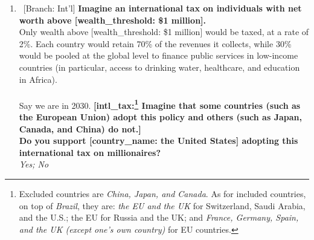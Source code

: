 \begin{enumerate}[resume]
\item ~[Branch: Int'l] \label{q:intl_tax_support} \textbf{Imagine an international tax on individuals with net worth above [wealth\_threshold: \$1 million].~}\\Only wealth above [wealth\_threshold: \$1 million] would be taxed, at a rate of 2\%. Each country would retain 70\% of the revenues it collects, while 30\% would be pooled at the global level to finance public services in low-income countries (in particular, access to drinking water, healthcare, and education in Africa). \\\\Say we are in 2030.\textbf{ [intl\_tax:\footnote{Excluded countries are \textit{China, Japan, and Canada}. As for included countries, on top of \textit{Brazil}, they are: \textit{the EU and the UK} for Switzerland, Saudi Arabia, and the U.S.; the EU\textit{} for Russia and the UK; and \textit{France, Germany, Spain, and the UK (except one's own country)} for EU countries.} Imagine that some countries  (such as the European Union) adopt this policy and others (such as Japan, Canada, and China) do not.]\\Do you support [country\_name: the United States] adopting this international tax on millionaires?}
  \\ \textit{Yes; No}

\end{enumerate} 


